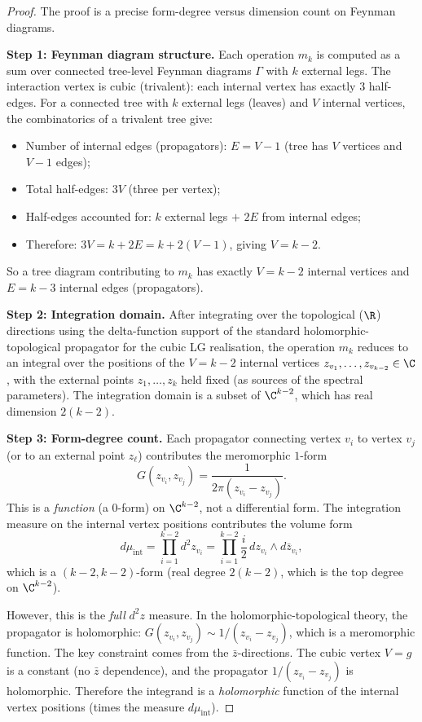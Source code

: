 \begin{proof}
The proof is a precise form-degree versus dimension count on Feynman diagrams.

\textbf{Step 1: Feynman diagram structure.}
Each operation $m_k$ is computed as a sum over connected tree-level Feynman diagrams $\Gamma$ with $k$ external legs. The interaction vertex is cubic (trivalent): each internal vertex has exactly $3$ half-edges. For a connected tree with $k$ external legs (leaves) and $V$ internal vertices, the combinatorics of a trivalent tree give:
\begin{itemize}
\item Number of internal edges (propagators): $E = V - 1$ (tree has $V$ vertices and $V-1$ edges);
\item Total half-edges: $3V$ (three per vertex);
\item Half-edges accounted for: $k$ external legs $+$ $2E$ from internal edges;
\item Therefore: $3V = k + 2E = k + 2(V-1)$, giving $V = k - 2$.
\end{itemize}
So a tree diagram contributing to $m_k$ has exactly $V = k-2$ internal vertices and $E = k-3$ internal edges (propagators).

\textbf{Step 2: Integration domain.}
After integrating over the topological ($\R$) directions using the
delta-function support of the standard holomorphic-topological
propagator for the cubic LG realisation, the operation $m_k$ reduces to
an integral over the positions of the $V = k-2$ internal vertices
$z_{v_1}, \ldots, z_{v_{k-2}} \in \C$, with the external points
$z_1, \ldots, z_k$ held fixed (as sources of the spectral parameters).
The integration domain is a subset of $\C^{k-2}$, which has real
dimension $2(k-2)$.

\textbf{Step 3: Form-degree count.}
Each propagator connecting vertex $v_i$ to vertex $v_j$ (or to an external point $z_\ell$) contributes the meromorphic $1$-form
\[
G(z_{v_i}, z_{v_j}) = \frac{1}{2\pi(z_{v_i} - z_{v_j})}.
\]
This is a \emph{function} (a $0$-form) on $\C^{k-2}$, not a differential form. The integration measure on the internal vertex positions contributes the volume form
\[
d\mu_{\text{int}} = \prod_{i=1}^{k-2} d^2 z_{v_i} = \prod_{i=1}^{k-2} \frac{i}{2}\, dz_{v_i} \wedge d\bar{z}_{v_i},
\]
which is a $(k-2, k-2)$-form (real degree $2(k-2)$, which is the top degree on $\C^{k-2}$).

However, this is the \emph{full} $d^2z$ measure. In the holomorphic-topological theory, the propagator is holomorphic: $G(z_{v_i}, z_{v_j}) \sim 1/(z_{v_i} - z_{v_j})$, which is a meromorphic function. The key constraint comes from the $\bar{z}$-directions. The cubic vertex $V = g$ is a constant (no $\bar{z}$ dependence), and the propagator $1/(z_{v_i} - z_{v_j})$ is holomorphic. Therefore the integrand is a \emph{holomorphic} function of the internal vertex positions (times the measure $d\mu_{\text{int}}$).


\end{proof}
